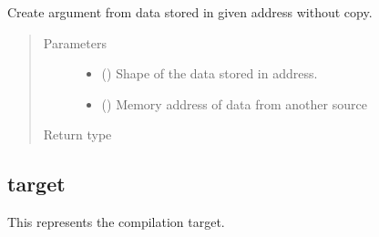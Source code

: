 \documentclass[letterpaper,10pt,english]{sphinxmanual}
\begin{document}
\begin{fulllineitems}
\label{\detokenize{reference/py:migraphx.argument_from_pointer}}
\sphinxAtStartPar
Create argument from data stored in given address without copy.
\begin{quote}\begin{description}
\item[{Parameters}] \leavevmode\begin{itemize}
\item {} 
\sphinxAtStartPar
{} ({\hyperref[\detokenize{reference/py:migraphx.shape}]{}}) \textendash{} Shape of the data stored in address.

\item {} 
\sphinxAtStartPar
{} () \textendash{} Memory address of data from another source

\end{itemize}

\item[{Return type}] \leavevmode
\sphinxAtStartPar
{\hyperref[\detokenize{reference/py:migraphx.argument}]{}}

\end{description}\end{quote}

\end{fulllineitems}



\subsection{target}
\label{\detokenize{reference/py:target}}

\begin{fulllineitems}
\label{\detokenize{reference/py:migraphx.target}}
\sphinxAtStartPar
This represents the compilation target.

\end{fulllineitems}
\end{document}
